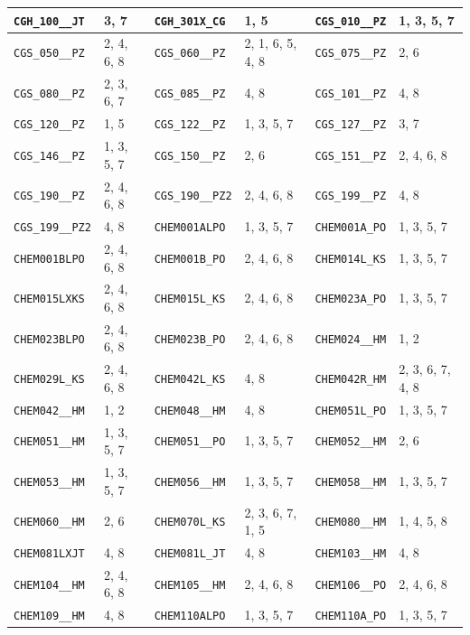 \begin{longtable}{|l|l||l|l||l|l|}
    \verb|CGH_100__JT| & 3, 7 & \verb|CGH_301X_CG| & 1, 5 & \verb|CGS_010__PZ| & 1, 3, 5, 7\\\hline
    \verb|CGS_050__PZ| & 2, 4, 6, 8 & \verb|CGS_060__PZ| & 2, 1, 6, 5, 4, 8 & \verb|CGS_075__PZ| & 2, 6\\\hline
    \verb|CGS_080__PZ| & 2, 3, 6, 7 & \verb|CGS_085__PZ| & 4, 8 & \verb|CGS_101__PZ| & 4, 8\\\hline
    \verb|CGS_120__PZ| & 1, 5 & \verb|CGS_122__PZ| & 1, 3, 5, 7 & \verb|CGS_127__PZ| & 3, 7\\\hline
    \verb|CGS_146__PZ| & 1, 3, 5, 7 & \verb|CGS_150__PZ| & 2, 6 & \verb|CGS_151__PZ| & 2, 4, 6, 8\\\hline
    \verb|CGS_190__PZ| & 2, 4, 6, 8 & \verb|CGS_190__PZ2| & 2, 4, 6, 8 & \verb|CGS_199__PZ| & 4, 8\\\hline
    \verb|CGS_199__PZ2| & 4, 8 & \verb|CHEM001ALPO| & 1, 3, 5, 7 & \verb|CHEM001A_PO| & 1, 3, 5, 7\\\hline
    \verb|CHEM001BLPO| & 2, 4, 6, 8 & \verb|CHEM001B_PO| & 2, 4, 6, 8 & \verb|CHEM014L_KS| & 1, 3, 5, 7\\\hline
    \verb|CHEM015LXKS| & 2, 4, 6, 8 & \verb|CHEM015L_KS| & 2, 4, 6, 8 & \verb|CHEM023A_PO| & 1, 3, 5, 7\\\hline
    \verb|CHEM023BLPO| & 2, 4, 6, 8 & \verb|CHEM023B_PO| & 2, 4, 6, 8 & \verb|CHEM024__HM| & 1, 2\\\hline
    \verb|CHEM029L_KS| & 2, 4, 6, 8 & \verb|CHEM042L_KS| & 4, 8 & \verb|CHEM042R_HM| & 2, 3, 6, 7, 4, 8\\\hline
    \verb|CHEM042__HM| & 1, 2 & \verb|CHEM048__HM| & 4, 8 & \verb|CHEM051L_PO| & 1, 3, 5, 7\\\hline
    \verb|CHEM051__HM| & 1, 3, 5, 7 & \verb|CHEM051__PO| & 1, 3, 5, 7 & \verb|CHEM052__HM| & 2, 6\\\hline
    \verb|CHEM053__HM| & 1, 3, 5, 7 & \verb|CHEM056__HM| & 1, 3, 5, 7 & \verb|CHEM058__HM| & 1, 3, 5, 7\\\hline
    \verb|CHEM060__HM| & 2, 6 & \verb|CHEM070L_KS| & 2, 3, 6, 7, 1, 5 & \verb|CHEM080__HM| & 1, 4, 5, 8\\\hline
    \verb|CHEM081LXJT| & 4, 8 & \verb|CHEM081L_JT| & 4, 8 & \verb|CHEM103__HM| & 4, 8\\\hline
    \verb|CHEM104__HM| & 2, 4, 6, 8 & \verb|CHEM105__HM| & 2, 4, 6, 8 & \verb|CHEM106__PO| & 2, 4, 6, 8\\\hline
    \verb|CHEM109__HM| & 4, 8 & \verb|CHEM110ALPO| & 1, 3, 5, 7 & \verb|CHEM110A_PO| & 1, 3, 5, 7\\\hline

\end{longtable}
